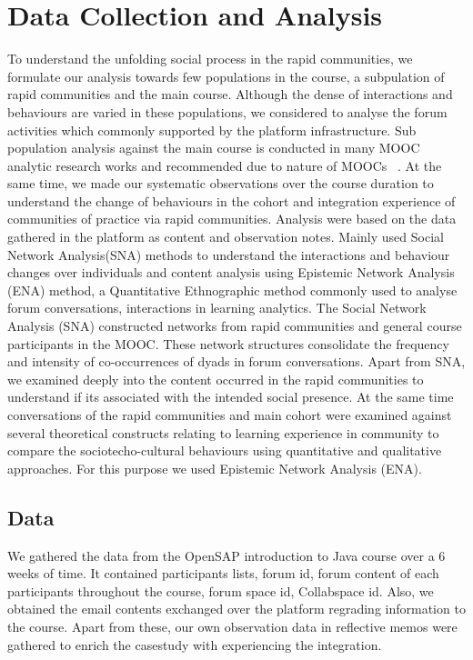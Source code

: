 \documentclass[manuscript,screen,review]{acmart}
\begin{document}
\section{Data Collection and Analysis}
To understand the unfolding social process in the rapid communities, we formulate our analysis towards few populations in the course, a subpulation of rapid communities and the main course. Although the dense of interactions and behaviours are varied in these populations, we considered to analyse the forum activities which commonly supported by the platform infrastructure. Sub population analysis against the main course is conducted in many MOOC analytic research works and recommended due to nature of MOOCs ~\cite{dowell2015modeling, poquet2018socia, joksimovic2015social, oleksandra2016untangling}. At the same time, we made our systematic observations over the course duration to understand the change of behaviours in the cohort and integration experience of communities of practice via rapid communities. Analysis were based on the data gathered in the platform as content and observation notes. Mainly used Social Network Analysis(SNA) methods to understand the interactions and behaviour changes over individuals and content analysis using Epistemic Network Analysis (ENA) method, a Quantitative Ethnographic method commonly used to analyse forum conversations, interactions in learning analytics. The Social Network Analysis (SNA) constructed networks from rapid communities and general course participants in the MOOC. These network structures consolidate the frequency and intensity of co-occurrences of dyads in forum conversations. Apart from SNA, we examined deeply into the content occurred in the rapid communities to understand if its associated with the intended social presence. At the same time conversations of the rapid communities and main cohort were examined against several theoretical constructs relating to learning experience in community  to compare the sociotecho-cultural behaviours using quantitative and qualitative approaches. For this purpose we used Epistemic Network Analysis (ENA).

\subsection{Data}
We gathered the data from the OpenSAP introduction to Java course over a 6 weeks of time. It contained participants lists, forum id, forum content of each participants throughout the course, forum space id, Collabspace id. Also, we obtained the email contents exchanged over the platform regrading information to the course. Apart from these, our own observation data in reflective memos were gathered to enrich the casestudy with experiencing the integration. 
\end{document}
